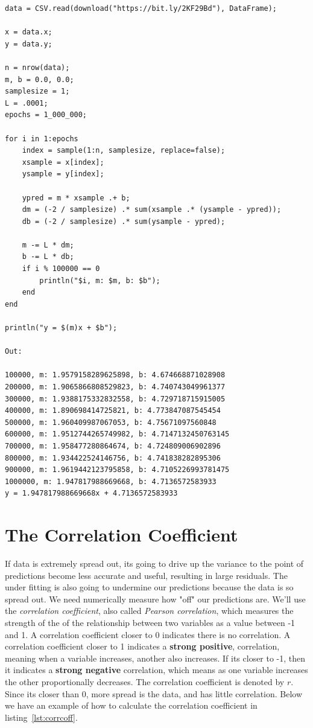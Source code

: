 \documentclass[a4paper, 11pt]{article}
\begin{document}
\begin{lstlisting}[label={lst:stochgdesc},caption={Stochastic Gradient Descent and Linear Regression}]
data = CSV.read(download("https://bit.ly/2KF29Bd"), DataFrame);

x = data.x;
y = data.y;

n = nrow(data);
m, b = 0.0, 0.0;
samplesize = 1;
L = .0001;
epochs = 1_000_000;

for i in 1:epochs
	index = sample(1:n, samplesize, replace=false);
	xsample = x[index];
	ysample = y[index];

	ypred = m * xsample .+ b;
	dm = (-2 / samplesize) .* sum(xsample .* (ysample - ypred));
	db = (-2 / samplesize) .* sum(ysample - ypred);
		
	m -= L * dm;
	b -= L * db;
	if i % 100000 == 0
		println("$i, m: $m, b: $b");
	end
end
		
println("y = $(m)x + $b");

Out:

100000, m: 1.9579158289625898, b: 4.674668871028908
200000, m: 1.9065866808529823, b: 4.740743049961377
300000, m: 1.9388175332832558, b: 4.729718715915005
400000, m: 1.890698414725821, b: 4.773847087545454
500000, m: 1.960409987067053, b: 4.75671097560848
600000, m: 1.9512744265749982, b: 4.7147132450763145
700000, m: 1.958477280864674, b: 4.724809006902896
800000, m: 1.934422524146756, b: 4.741838282895306
900000, m: 1.9619442123795858, b: 4.7105226993781475
1000000, m: 1.947817988669668, b: 4.7136572583933
y = 1.947817988669668x + 4.7136572583933
\end{lstlisting}

\section{The Correlation Coefficient}
If data is extremely spread out, its going to drive up the variance to the point of predictions become less accurate and useful, resulting in large residuals. The under fitting is also going to undermine our predictions because the data is so spread out. We need numerically measure how "off" our predictions are. We'll use the \textit{correlation coefficient}, also called \textit{Pearson correlation}, which measures the strength of the of the relationship between two variables as a value between -1 and 1. A correlation coefficient closer to 0 indicates there is no correlation. A correlation coefficient closer to 1 indicates a \textbf{strong positive}, correlation, meaning when a variable increases, another also increases. If its closer to -1, then it indicates a \textbf{strong negative} correlation, which means as one variable increases the other proportionally decreases. The correlation coefficient is denoted by $r$. Since its closer than 0, more spread is the data, and has little correlation. Below we have an example of how to calculate the correlation coefficient in listing~\ref{lst:corrcoff}.
\end{document}
